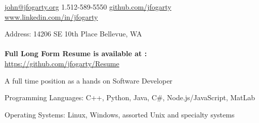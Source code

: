\documentclass[10pt,letterpaper]{article}
\begin{document}
\sloppy  %



\nobreakvspace{1em}  %

\noindent\href{mailto:john.at.jfogarty.dot.org}{john\mbox{}@\mbox{}jfogarty.org}\sbull
\textsmaller{+}1.512-589-5550\sbull
\href{https://github.com/jfogarty}{github.com/jfogarty}
\sbull
\href{http://www.linkedin.com/in/jfogarty}{www.linkedin.com/in/jfogarty}

\nobreakvspace{1mm}  %
\noindent
Address: 14206 SE 10th Place\sbull
Bellevue, WA
\\
\\
\textbf{Full Long Form Resume is available at :}
\href{https://github.com/jfogarty/Resume/raw/master/jfogarty-resume-2022.pdf}{https://github.com/jfogarty/Resume}

\spacedhrule{0.9em}{-0.4em}  %



\inlineheadsection
{A full time position as a hands on Software Developer}
{}

\vspace{1em}\spacedhrule{0.5em}{-0.4em}


\vspace{0.5em}
\inlineheadsection
{Programming Languages:}
{C++, Python, Java, C\#, Node.js/JavaScript, MatLab}

\vspace{0.5em}\inlineheadsection
{Operating Systems:}
{Linux, Windows, assorted Unix and specialty systems}
\end{document}
